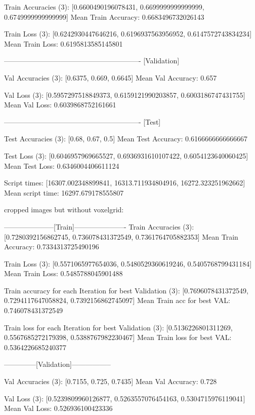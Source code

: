 Train Accuracies (3): 
[0.6600490196078431, 0.6699999999999999, 0.6749999999999999]
Mean Train Accuracy: 0.6683496732026143

Train Loss (3): 
[0.6242930447646216, 0.6196937563956952, 0.6147572743834234]
Mean Train Loss: 0.6195813585145801


----------------------------------------------------------
[Validation]

Val Accuracies (3): 
[0.6375, 0.669, 0.6645]
Mean Val Accuracy: 0.657

Val Loss (3): 
[0.5957297518849373, 0.6159121990203857, 0.6003186747431755]
Mean Val Loss: 0.6039868752161661


----------------------------------------------------------
[Test]

Test Accuracies (3): 
[0.68, 0.67, 0.5]
Mean Test Accuracy: 0.6166666666666667

Test Loss (3): 
[0.6046957969665527, 0.6936931610107422, 0.6054123640060425]
Mean Test Loss: 0.6346004406611124



Script times: [16307.002348899841, 16313.711934804916, 16272.323251962662]
Mean script time: 16297.679178555807










cropped images but without voxelgrid:


---------------------[Train]----------------------
Train Accuracies (3): 
[0.7280392156862745, 0.736078431372549, 0.7361764705882353]
Mean Train Accuracy: 0.7334313725490196

Train Loss (3): 
[0.5571065977654036, 0.5480529360619246, 0.5405768799431184]
Mean Train Loss: 0.5485788045901488

Train accuracy for each Iteration for best Validation (3): 
[0.7696078431372549, 0.7294117647058824, 0.7392156862745097]
Mean Train acc for best VAL: 0.746078431372549

Train loss for each Iteration for best Validation (3): 
[0.5136226801311269, 0.5567685272179398, 0.5388767982230467]
Mean Train loss for best VAL: 0.5364226685240377


--------------[Validation]-----------------

Val Accuracies (3): 
[0.7155, 0.725, 0.7435]
Mean Val Accuracy: 0.728

Val Loss (3): 
[0.5239809960126877, 0.5263557076454163, 0.5304715976119041]
Mean Val Loss: 0.526936100423336

